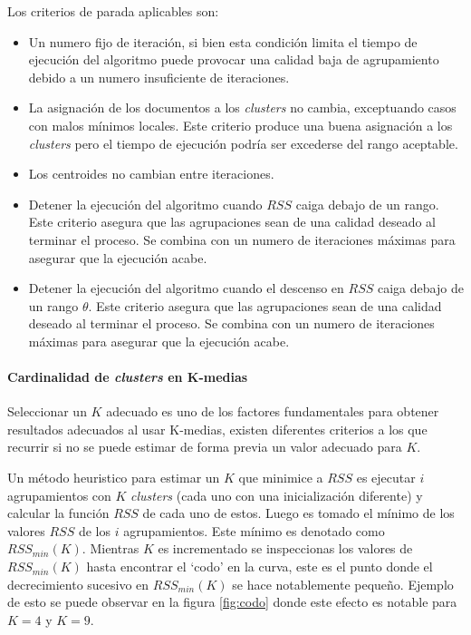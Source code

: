     
    Los criterios de parada aplicables son:
      \begin{itemize}
        \item Un numero fijo de iteración, si bien esta condición limita el tiempo de ejecución del algoritmo puede provocar una calidad baja de agrupamiento debido a un numero insuficiente de iteraciones.
        \item La asignación de los documentos a los \textit{clusters} no cambia, exceptuando casos con malos mínimos locales. Este criterio produce una buena asignación a los \textit{clusters} pero el tiempo de ejecución podría ser excederse del rango aceptable.
        \item Los centroides no cambian entre iteraciones.
        \item Detener la ejecución del algoritmo cuando $RSS$ caiga debajo de un rango. Este criterio asegura que las agrupaciones sean de una calidad deseado al terminar el proceso. Se combina con un numero de iteraciones máximas para asegurar que la ejecución acabe.
        \item Detener la ejecución del algoritmo cuando el descenso en $RSS$ caiga debajo de un rango $\theta$. Este criterio asegura que las agrupaciones sean de una calidad deseado al terminar el proceso. Se combina con un numero de iteraciones máximas para asegurar que la ejecución acabe.
      \end{itemize}
    
    \paragraph{Cardinalidad de \textit{clusters} en K-medias}

    Seleccionar un $K$ adecuado es uno de los factores fundamentales para obtener resultados adecuados al usar K-medias, existen diferentes criterios a los que recurrir si no se puede estimar de forma previa un valor adecuado para $K$.\cite{informationretrieval}

    Un método heuristico para estimar un $K$ que minimice a $RSS$ es ejecutar $i$ agrupamientos con $K$ \textit{clusters} (cada uno con una inicialización diferente) y calcular la función $RSS$ de cada uno de estos. Luego es tomado el mínimo de los valores $RSS$ de los $i$ agrupamientos. Este mínimo es denotado como $RSS_{min}(K)$. Mientras $K$ es incrementado se inspeccionas los valores de $RSS_{min}(K)$ hasta encontrar el `codo' en la curva, este es el punto donde el decrecimiento sucesivo en $RSS_{min}(K)$ se hace notablemente pequeño. Ejemplo de esto se puede observar en la figura \ref{fig:codo} donde este efecto es notable para $K=4$  y $K=9$.\cite{informationretrieval}

